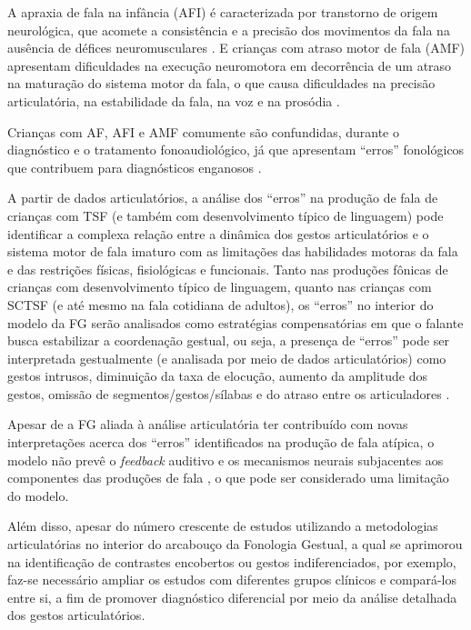 \documentclass[output=paper,colorlinks,citecolor=brown,booklanguage=portuguese]{langscibook}
\begin{document}
A apraxia de fala na infância (AFI) é caracterizada por transtorno de origem neurológica, que acomete a consistência e a precisão dos movimentos da fala na ausência de défices neuromusculares \citep{ASHA2007, ASHA2017}. E crianças com atraso motor de fala (AMF) apresentam dificuldades na execução neuromotora em decorrência de um atraso na maturação do sistema motor da fala, o que causa dificuldades na precisão articulatória, na estabilidade da fala, na voz e na prosódia \citep{Shriberg2019a}.

Crianças com AF, AFI e AMF comumente são confundidas, durante o diagnóstico e o tratamento fonoaudiológico, já que apresentam “erros” fonológicos que contribuem para diagnósticos enganosos \citep{Nijland2003, Aziz2010}. 

A partir de dados articulatórios, a análise dos “erros” na produção de fala de crianças com TSF (e também com desenvolvimento típico de linguagem) pode identificar a complexa relação entre a dinâmica dos gestos articulatórios e o sistema motor de fala imaturo com as limitações das habilidades motoras da fala e das restrições físicas, fisiológicas e funcionais. Tanto nas produções fônicas de crianças com desenvolvimento típico de linguagem, quanto nas crianças com SCTSF (e até mesmo na fala cotidiana de adultos), os “erros” no interior do modelo da FG serão analisados como estratégias compensatórias em que o falante busca estabilizar a coordenação gestual, ou seja, a presença de “erros” pode ser interpretada gestualmente (e analisada por meio de dados articulatórios) como gestos intrusos, diminuição da taxa de elocução, aumento da 
amplitude dos gestos, omissão de segmentos/gestos/sílabas e do atraso entre os articuladores \citep{Namasivayam2020}. 

Apesar de a FG aliada à análise articulatória ter contribuído com novas interpretações acerca dos “erros” identificados na produção de fala atípica, o modelo não prevê o \emph{feedback} auditivo e os mecanismos neurais subjacentes aos componentes das produções de fala \citep{Namasivayam2020}, o que pode ser considerado uma limitação do modelo. 

Além disso, apesar do número crescente de estudos utilizando a metodologias articulatórias no interior do arcabouço da Fonologia Gestual, a qual se aprimorou na identificação de contrastes encobertos ou gestos indiferenciados, por exemplo, faz-se necessário ampliar os estudos com diferentes grupos clínicos e compará-los entre si, a fim de promover diagnóstico diferencial por meio da análise detalhada dos gestos articulatórios.
\end{document}

